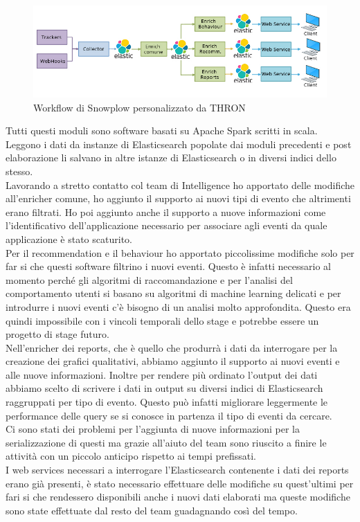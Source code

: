 \documentclass[a4paper, 12pt, twoside, openright]{book}
\begin{document}
\begin{figure}[H]
	\centering
	\label{snowplow-workflow-thron}	\includegraphics[width=1.0\textwidth]{images/snowplow-workflow-thron.jpg}
	\caption{Workflow di Snowplow personalizzato da THRON}
\end{figure} 
Tutti questi moduli sono software basati su Apache Spark scritti in scala. Leggono i dati da instanze di Elasticsearch popolate dai moduli precedenti e post elaborazione li salvano in altre istanze di Elasticsearch o in diversi indici dello stesso.\\
Lavorando a stretto contatto col team di Intelligence ho apportato delle modifiche all'enricher comune, ho aggiunto il supporto ai nuovi tipi di evento che altrimenti erano filtrati. Ho poi aggiunto anche il supporto a nuove informazioni come l'identificativo dell'applicazione necessario per associare agli eventi da quale applicazione è stato scaturito.\\
Per il recommendation e il behaviour ho apportato piccolissime modifiche solo per far si che questi software filtrino i nuovi eventi. Questo è infatti necessario al momento perché gli algoritmi di raccomandazione e per l'analisi del comportamento utenti si basano su algoritmi di machine learning delicati e per introdurre i nuovi eventi c'è bisogno di un analisi molto approfondita. Questo era quindi impossibile con i vincoli temporali dello stage e potrebbe essere un progetto di stage futuro.\\
Nell'enricher dei reports, che è quello che produrrà i dati da interrogare per la creazione dei grafici qualitativi, abbiamo aggiunto il supporto ai nuovi eventi e alle nuove informazioni. Inoltre per rendere più ordinato l'output dei dati abbiamo scelto di scrivere i dati in output su diversi indici di Elasticsearch raggruppati per tipo di evento. Questo può infatti migliorare leggermente le performance delle query se si conosce in partenza il tipo di eventi da cercare.\\
Ci sono stati dei problemi per l'aggiunta di nuove informazioni per la serializzazione di questi ma grazie all'aiuto del team sono riuscito a finire le attività con un piccolo anticipo rispetto ai tempi prefissati.\\
I web services necessari a interrogare l'Elasticsearch contenente i dati dei reports erano già presenti, è stato necessario effettuare delle modifiche su quest'ultimi per fari si che rendessero disponibili anche i nuovi dati elaborati ma queste modifiche sono state effettuate dal resto del team guadagnando così del tempo.\\
\end{document}
